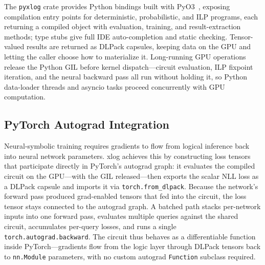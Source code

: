 The \texttt{pyxlog} crate provides Python bindings built with PyO3~\cite{pyo3}, exposing compilation entry points for deterministic, probabilistic, and ILP programs, each returning a compiled object with evaluation, training, and result-extraction methods; type stubs give full IDE auto-completion and static checking. Tensor-valued results are returned as DLPack capsules, keeping data on the GPU and letting the caller choose how to materialize it. Long-running GPU operations release the Python GIL before kernel dispatch---circuit evaluation, ILP fixpoint iteration, and the neural backward pass all run without holding it, so Python data-loader threads and asyncio tasks proceed concurrently with GPU computation.

\subsection{PyTorch Autograd Integration}

Neural-symbolic training requires gradients to flow from logical inference back into neural network parameters. xlog achieves this by constructing loss tensors that participate directly in PyTorch's autograd graph: it evaluates the compiled circuit on the GPU---with the GIL released---then exports the scalar NLL loss as a DLPack capsule and imports it via \texttt{torch.from\_dlpack}. Because the network's forward pass produced grad-enabled tensors that fed into the circuit, the loss tensor stays connected to the autograd graph. A batched path stacks per-network inputs into one forward pass, evaluates multiple queries against the shared circuit, accumulates per-query losses, and runs a single \texttt{torch.autograd.backward}. The circuit thus behaves as a differentiable function inside PyTorch---gradients flow from the logic layer through DLPack tensors back to \texttt{nn.Module} parameters, with no custom autograd \texttt{Function} subclass required.
